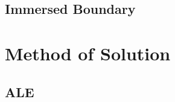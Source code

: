 \documentclass{article}
\begin{document}
\subsection{Immersed Boundary}



\section{Method of Solution}

\subsection{ALE}
\end{document}

